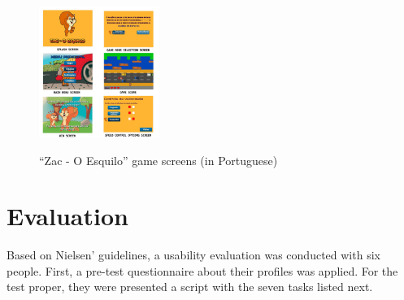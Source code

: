 \documentclass[a4paper]{sbgames}               %
\begin{document}
\begin{figure}['htc']
	\centering
	\caption{``Zac - O Esquilo'' game screens (in Portuguese)}
	\includegraphics[width=0.35\textwidth]{./images/zac-scenes.jpg}
  	\label{fig:ZacGameScenes}
\end{figure}

\section{Evaluation}
\label{sec:evaluation}
Based on Nielsen'  guidelines, a usability evaluation was conducted with six people. First, a pre-test questionnaire about their profiles was applied. For the test proper, they were presented a script with the seven tasks listed next.
\end{document}
